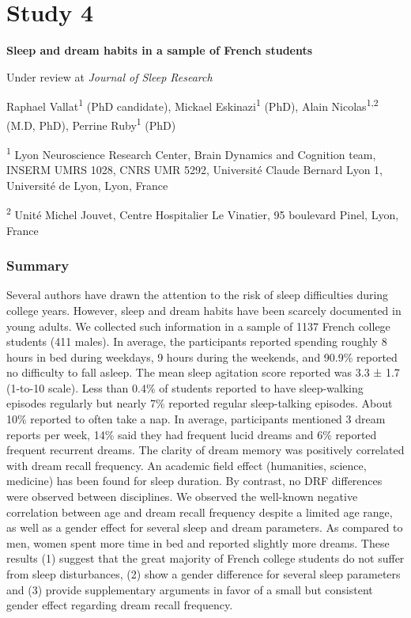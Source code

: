 \cleardoublepage

\chapter{Study 4}
\label{res:survey}

\textbf{{\large Sleep and dream habits in a sample of French students}}

\hfill Under review at \emph{Journal of Sleep Research}

\bigskip

Raphael Vallat\textsuperscript{1} (PhD candidate), Mickael Eskinazi\textsuperscript{1} (PhD), Alain Nicolas\textsuperscript{1,2} (M.D, PhD), Perrine Ruby\textsuperscript{1} (PhD)

\textsuperscript{1} Lyon Neuroscience Research Center, Brain Dynamics and Cognition team, INSERM UMRS 1028, CNRS UMR 5292, Université Claude Bernard Lyon 1, Université de Lyon, Lyon, France

\textsuperscript{2} Unité Michel Jouvet, Centre Hospitalier Le Vinatier, 95 boulevard Pinel, Lyon, France

\subsection*{Summary}
\label{res:survey:summary}

Several authors have drawn the attention to the risk of sleep difficulties during college years. However, sleep and dream habits have been scarcely documented in young adults. We collected such information in a sample of 1137 French college students (411 males). In average, the participants reported spending roughly 8 hours in bed during weekdays, 9 hours during the weekends, and 90.9\% reported no difficulty to fall asleep. The mean sleep agitation score reported was 3.3 ± 1.7 (1-to-10 scale). Less than 0.4\% of students reported to have sleep-walking episodes regularly but nearly 7\% reported regular sleep-talking episodes. About 10\% reported to often take a nap. In average, participants mentioned 3 dream reports per week, 14\% said they had frequent lucid dreams and 6\% reported frequent recurrent dreams. The clarity of dream memory was positively correlated with dream recall frequency. An academic field effect (humanities, science, medicine) has been found for sleep duration. By contrast, no DRF differences were observed between disciplines. We observed the well-known negative correlation between age and dream recall frequency despite a limited age range, as well as a gender effect for several sleep and dream parameters. As compared to men, women spent more time in bed and reported slightly more dreams. These results (1) suggest that the great majority of French college students do not suffer from sleep disturbances, (2) show a gender difference for several sleep parameters and (3) provide supplementary arguments in favor of a small but consistent gender effect regarding dream recall frequency.

